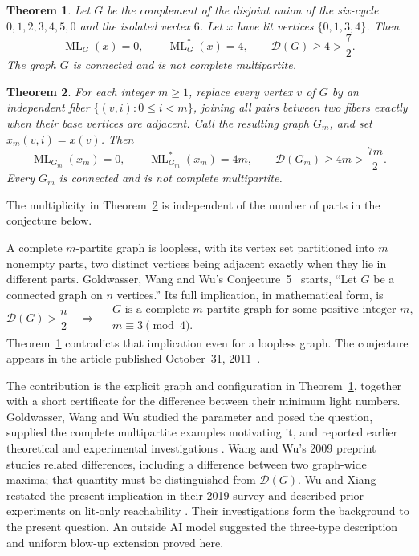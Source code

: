 \documentclass[11pt]{article}
\newtheorem{theorem}{Theorem}
\newcommand{\ML}{\operatorname{ML}}
\begin{document}
\begin{theorem}\label{thm:main}
Let $G$ be the complement of the disjoint union of the six-cycle
$0,1,2,3,4,5,0$ and the isolated vertex $6$. Let $x$ have lit vertices
$\{0,1,3,4\}$. Then
\[
 \ML_G(x)=0,\qquad \ML_G^*(x)=4,\qquad
 \mathcal D(G)\geq4>\frac72.
\]
The graph $G$ is connected and is not complete multipartite.
\end{theorem}


\begin{theorem}\label{thm:blowup}
For each integer $m\geq1$, replace every vertex $v$ of $G$ by an independent
fiber $\{(v,i):0\leq i<m\}$, joining all pairs between two fibers exactly
when their base vertices are adjacent. Call the resulting graph $G_m$,
and set $x_m(v,i)=x(v)$. Then
\[
 \ML_{G_m}(x_m)=0,\qquad \ML_{G_m}^*(x_m)=4m,\qquad
 \mathcal D(G_m)\geq4m>\frac{7m}{2}.
\]
Every $G_m$ is connected and is not complete multipartite.
\end{theorem}

The multiplicity in Theorem~\ref{thm:blowup} is independent of the number
of parts in the conjecture below.

A complete $m$-partite graph is loopless, with its vertex set partitioned
into $m$ nonempty parts, two distinct vertices being adjacent exactly when
they lie in different parts. Goldwasser, Wang and Wu's
Conjecture~5~\cite[p.~5]{GWW} starts, ``Let $G$ be a connected graph on
$n$ vertices.'' Its full implication, in mathematical form, is
\[
 \mathcal D(G)>\frac n2
 \quad\Longrightarrow\quad
 \begin{gathered}
 G\text{ is a complete }m\text{-partite graph for some positive integer }m,\\[-2pt]
 m\equiv3\pmod4.
 \end{gathered}
\]
Theorem~\ref{thm:main} contradicts that implication even for a loopless
graph. The conjecture appears in the article published
October~31, 2011~\cite{GWW}.

The contribution is the explicit graph and configuration in
Theorem~\ref{thm:main}, together with a short certificate for the
difference between their minimum light numbers. Goldwasser, Wang and Wu
studied the parameter and posed the
question, supplied the complete multipartite examples motivating it, and
reported earlier theoretical and experimental investigations
\cite[Example~4 and pp.~5--6]{GWW}. Wang and Wu's 2009
preprint~\cite{WW} studies related differences, including a difference
between two graph-wide maxima; that quantity must be distinguished from
$\mathcal D(G)$. Wu and Xiang restated the present implication in their
2019 survey and described prior experiments on lit-only reachability
\cite[Conjecture~3.3 and pp.~10--11 of the author manuscript]{WX}.
Their investigations form the background to the present question.
An outside AI model suggested the three-type description and uniform
blow-up extension proved here.
\end{document}
